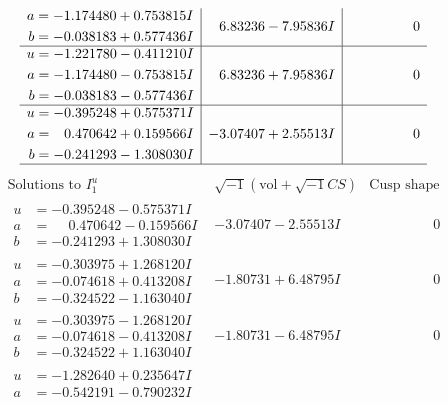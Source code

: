 \documentclass[1p]{elsarticle_modified}
\theoremstyle{definition}
\newcommand{\I}{\sqrt{-1}}
\begin{document}
$$\begin{array}{c|c|c}
\begin{aligned}
a &= -1.174480 + 0.753815 I \\
b &= -0.038183 + 0.577436 I\end{aligned}
 & \phantom{-}6.83236 - 7.95836 I & \phantom{-0.000000 } 0 \\ \hline\begin{aligned}
u &= -1.221780 - 0.411210 I \\
a &= -1.174480 - 0.753815 I \\
b &= -0.038183 - 0.577436 I\end{aligned}
 & \phantom{-}6.83236 + 7.95836 I & \phantom{-0.000000 } 0 \\ \hline\begin{aligned}
u &= -0.395248 + 0.575371 I \\
a &= \phantom{-}0.470642 + 0.159566 I \\
b &= -0.241293 - 1.308030 I\end{aligned}
 & -3.07407 + 2.55513 I & \phantom{-0.000000 } 0\\
 \hline 
 \end{array}$$\newpage$$\begin{array}{c|c|c}  
\text{Solutions to }I^u_{1}& \I (\text{vol} + \sqrt{-1}CS) & \text{Cusp shape}\\
 \hline 
\begin{aligned}
u &= -0.395248 - 0.575371 I \\
a &= \phantom{-}0.470642 - 0.159566 I \\
b &= -0.241293 + 1.308030 I\end{aligned}
 & -3.07407 - 2.55513 I & \phantom{-0.000000 } 0 \\ \hline\begin{aligned}
u &= -0.303975 + 1.268120 I \\
a &= -0.074618 + 0.413208 I \\
b &= -0.324522 - 1.163040 I\end{aligned}
 & -1.80731 + 6.48795 I & \phantom{-0.000000 } 0 \\ \hline\begin{aligned}
u &= -0.303975 - 1.268120 I \\
a &= -0.074618 - 0.413208 I \\
b &= -0.324522 + 1.163040 I\end{aligned}
 & -1.80731 - 6.48795 I & \phantom{-0.000000 } 0 \\ \hline\begin{aligned}
u &= -1.282640 + 0.235647 I \\
a &= -0.542191 - 0.790232 I \\

\end{aligned}
\end{array}$$
\end{document}
